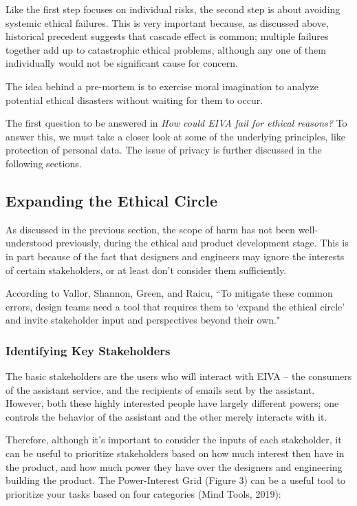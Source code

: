 \documentclass{article}
\begin{document}
Like the first step focuses on individual risks, the second step is about avoiding systemic ethical failures. This is very important because, as discussed above, historical precedent suggests that cascade effect is common; multiple failures together add up to catastrophic ethical problems, although any one of them individually would not be significant cause for concern.

The idea behind a pre-mortem is to exercise moral imagination to analyze potential ethical disasters without waiting for them to occur.

The first question to be answered in \emph{How could EIVA fail for ethical reasons?} To answer this, we must take a closer look at some of the underlying principles, like protection of personal data. The issue of privacy is further discussed in the following sections.

\subsection{Expanding the Ethical Circle}

As discussed in the previous section, the scope of harm has not been well-understood previously, during the ethical and product development stage. This is in part because of the fact that designers and engineers may ignore the interests of certain stakeholders, or at least don't consider them sufficiently.

According to Vallor, Shannon, Green, and Raicu, ``To mitigate these common errors, design teams need a tool that requires them to ‘expand the ethical circle’ and invite stakeholder input and perspectives beyond their own."

\subsubsection{Identifying Key Stakeholders}

The basic stakeholders are the users who will interact with EIVA -- the consumers of the assistant service, and the recipients of emails sent by the assistant. However, both these highly interested people have largely different powers; one controls the behavior of the assistant and the other merely interacts with it.

Therefore, although it's important to consider the inputs of each stakeholder, it can be useful to prioritize stakeholders based on how much interest then have in the product, and how much power they have over the designers and engineering building the product. The Power-Interest Grid (Figure 3) can be a useful tool to prioritize your tasks based on four categories (Mind Tools, 2019):
\end{document}

